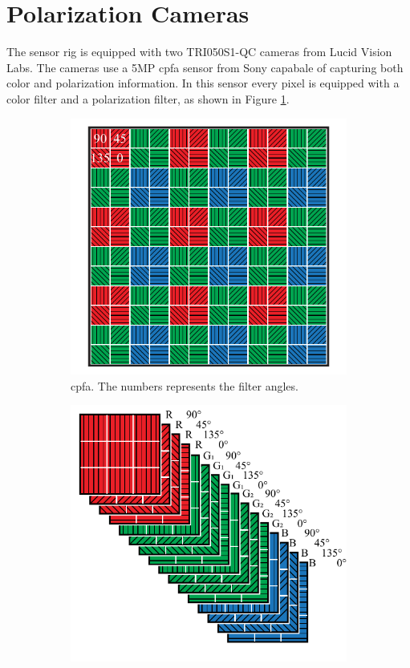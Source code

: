 \section{Polarization Cameras}
The sensor rig is equipped with two TRI050S1-QC cameras from Lucid Vision Labs.
The cameras use a 5MP \gls{cpfa} sensor from Sony capabale of capturing both color and polarization information. 
In this sensor every pixel is equipped with a color filter and a polarization filter, as shown in Figure \ref{fig:cpfa}.

\begin{figure}[H]
    \begin{subfigure}[B]{.48\textwidth}
        \centering
        \includegraphics[width=\textwidth]{figures/sensor_layout.pdf}
        \caption{\gls{cpfa}. The numbers represents the filter angles.\label{fig:cpfa}}
    \end{subfigure}
    \hfill
    \begin{subfigure}[B]{.48\textwidth}
        \includegraphics[width=\textwidth]{figures/sensor_packaging.pdf}

\end{subfigure}
\end{figure}
